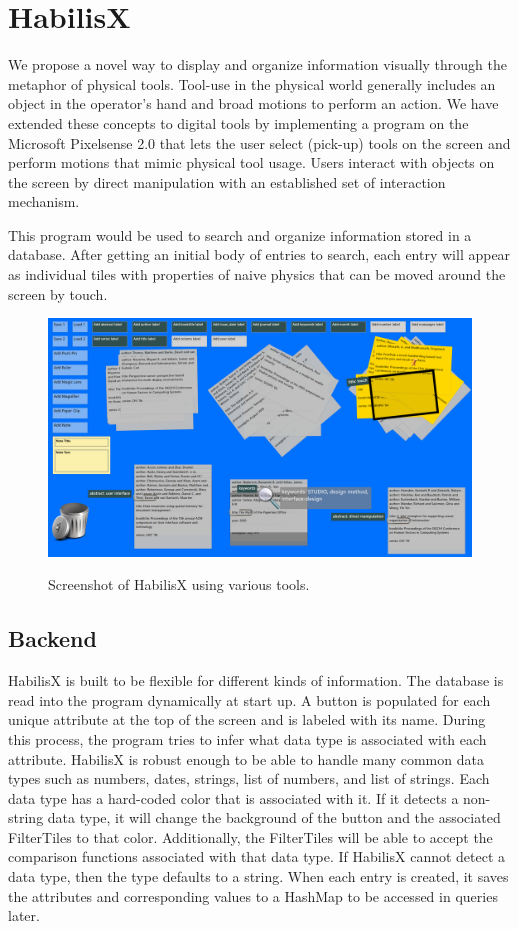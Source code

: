 \documentclass{article}
\begin{document}
\section{HabilisX}

We propose a novel way to display and organize information visually through the metaphor of physical tools. Tool-use in the physical world generally includes an object in the operator's hand and broad motions to perform an action. We have extended these concepts to digital tools by implementing a program on the Microsoft Pixelsense 2.0 that lets the user select (pick-up) tools on the screen and perform motions that mimic physical tool usage. Users interact with objects on the screen by direct manipulation with an established set of interaction mechanism.  

This program would be used to search and organize information stored in a database.  After getting an initial body of entries to search, each entry will appear as individual tiles with properties of naive physics that can be moved around the screen by touch. 


\begin{figure}[t!]
\centering
\scalebox{.239}
{\includegraphics{HabilisScreenShot.png}}
\caption{Screenshot of HabilisX using various tools.}
\label{Fig:screenshot}
\end{figure}

\subsection{Backend}

HabilisX is built to be flexible for different kinds of information.  The database is read into the program dynamically at start up.  A button is populated for each unique attribute at the top of the screen and is labeled with its name.  During this process, the program tries to infer what data type is associated with each attribute.  HabilisX is robust enough to be able to handle many common data types such as numbers, dates, strings, list of numbers, and list of strings.  Each data type has a hard-coded color that is associated with it.  If it detects a non-string data type, it will change the background of the button and the associated FilterTiles to that color.  Additionally, the FilterTiles will be able to accept the comparison functions associated with that data type.  If HabilisX cannot detect a data type, then the type defaults to a string.  When each entry is created, it saves the attributes and corresponding values to a HashMap to be accessed in queries later.  
\end{document}
